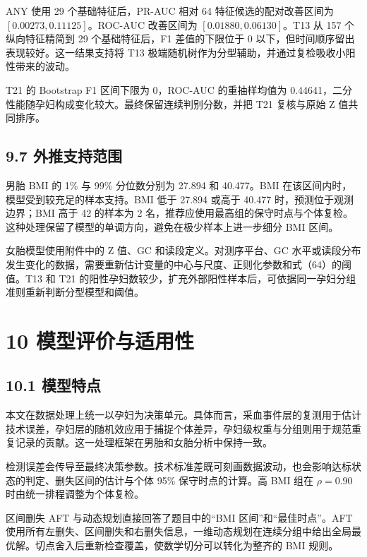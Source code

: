 \documentclass[UTF8,fontset=fandol,zihao=-4,a4paper]{ctexart}
\begin{document}
ANY 使用 29 个基础特征后，PR-AUC 相对 64 特征候选的配对改善区间为
\([0.00273,0.11125]\)。ROC-AUC 改善区间为 \([0.01880,0.06130]\)。T13 从
157 个纵向特征精简到 29 个基础特征后，F1 差值的下限位于 0
以下，但时间顺序留出表现较好。这一结果支持将 T13
极端随机树作为分型辅助，并通过复检吸收小阳性带来的波动。

T21 的 Bootstrap F1 区间下限为 0，ROC-AUC 的重抽样均值为
0.44641，二分性能随孕妇构成变化较大。最终保留连续判别分数，并把 T21
复核与原始 Z 值共同排序。

\subsection{9.7
外推支持范围}\label{ux5916ux63a8ux652fux6301ux8303ux56f4}

男胎 BMI 的 1\% 与 99\% 分位数分别为 27.894 和 40.477。BMI
在该区间内时，模型受到较充足的样本支持。BMI 低于 27.894 或高于 40.477
时，预测位于观测边界；BMI 高于 42 的样本为 2
名，推荐应使用最高组的保守时点与个体复检。这种处理保留了模型的单调方向，避免在极少样本上进一步细分
BMI 区间。

女胎模型使用附件中的 Z 值、GC 和读段定义。对测序平台、GC
水平或读段分布发生变化的数据，需要重新估计变量的中心与尺度、正则化参数和式（64）的阈值。T13
和 T21
的阳性孕妇数较少，扩充外部阳性样本后，可依据同一孕妇分组准则重新判断分型模型和阈值。

\section{10
模型评价与适用性}\label{ux6a21ux578bux8bc4ux4ef7ux4e0eux9002ux7528ux6027}

\subsection{10.1 模型特点}\label{ux6a21ux578bux7279ux70b9}

本文在数据处理上统一以孕妇为决策单元。具体而言，采血事件层的复测用于估计技术误差，孕妇层的随机效应用于捕捉个体差异，孕妇级权重与分组则用于规范重复记录的贡献。这一处理框架在男胎和女胎分析中保持一致。

检测误差会传导至最终决策参数。技术标准差既可刻画数据波动，也会影响达标状态的判定、删失区间的估计与个体
95\% 保守时点的计算。高 BMI 组在 \(\rho=0.90\)
时由统一排程调整为个体复检。

区间删失 AFT 与动态规划直接回答了题目中的``BMI 区间''和``最佳时点''。AFT
使用所有左删失、区间删失和右删失信息，一维动态规划在连续分组中给出全局最优解。切点舍入后重新检查覆盖，使数学切分可以转化为整齐的
BMI 规则。
\end{document}

